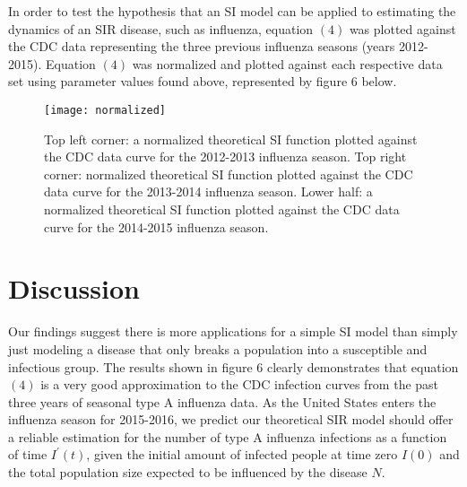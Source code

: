 \documentclass[11pt, oneside]{article}   	%
\begin{document}
In order to test the hypothesis that an SI model can be applied to estimating the dynamics of an SIR disease, such as influenza, equation $(4)$ was plotted against the CDC data representing the three previous influenza seasons (years 2012-2015). Equation $(4)$ was normalized and plotted against each respective data set using parameter values found above, represented by figure 6 below.

\begin{figure}[H]
\begin{center}
\texttt{[image: normalized]}
\caption{Top left corner: a normalized theoretical SI function plotted against the CDC data curve for the 2012-2013 influenza season. 
		Top right corner: normalized theoretical SI function plotted against the CDC data curve for the 2013-2014 influenza season.
		Lower half: a normalized theoretical SI function plotted against the CDC data curve for the 2014-2015 influenza season. }
\label{default}
\end{center}
\end{figure}


\section{Discussion}
Our findings suggest there is more applications for a simple SI model than simply just modeling a disease that only breaks a population into a susceptible and infectious group. The results shown in figure 6 clearly demonstrates that equation $(4)$ is a very good approximation to the CDC infection curves from the past three years of seasonal type A influenza data. As the United States enters the influenza season for 2015-2016, we predict our theoretical SIR model should offer a reliable estimation for the number of type A influenza infections as a function of time $I^{\prime}(t)$, given the initial amount of infected people at time zero $I(0)$ and the total population size expected to be influenced by the disease $N$.
\end{document}
